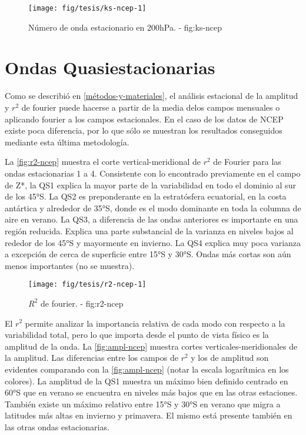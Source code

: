 \documentclass[spanish,a4paper]{book}
\begin{document}
\begin{figure*}
\texttt{[image: fig/tesis/ks-ncep-1]} \caption{Número de onda estacionario en 200hPa. - fig:ks-ncep}\label{fig:ks-ncep}
\end{figure*}

\section{Ondas Quasiestacionarias}\label{ondas-quasiestacionarias}

Como se describió en \autoref{métodos-y-materiales}, el análisis
estacional de la amplitud y \(r^2\) de fourier puede hacerse a partir de
la media delos campos mensuales o aplicando fourier a los campos
estacionales. En el caso de los datos de NCEP existe poca diferencia,
por lo que sólo se muestran los resultados conseguidos mediante esta
última metodología.

La \autoref{fig:r2-ncep} muestra el corte vertical-meridional de \(r^2\)
de Fourier para las ondas estacionarias 1 a 4. Consistente con lo
encontrado previamente en el campo de Z*, la QS1 explica la mayor parte
de la variabilidad en todo el dominio al sur de los 45°S. La QS2 es
preponderante en la estratósfera ecuatorial, en la costa antártica y
alrededor de 35°S, donde es el modo dominante en toda la columna de aire
en verano. La QS3, a diferencia de las ondas anteriores es importante en
una región reducida. Explica una parte substancial de la varianza en
niveles bajos al rededor de los 45°S y mayormente en invierno. La QS4
explica muy poca varianza a excepción de cerca de superficie entre 15°S
y 30°S. Ondas más cortas son aún menos importantes (no se muestra).

\begin{landscape}\begin{figure}

{\centering \texttt{[image: fig/tesis/r2-ncep-1]} 

}

\caption{$R^2$ de fourier. - fig:r2-ncep}\label{fig:r2-ncep}
\end{figure}
\end{landscape}

El \(r^2\) permite analizar la importancia relativa de cada modo con
respecto a la variabilidad total, pero lo que importa desde el punto de
vista físico es la amplitud de la onda. La \autoref{fig:ampl-ncep}
muestra cortes verticales-meridionales de la amplitud. Las diferencias
entre los campos de \(r^2\) y los de amplitud son evidentes comparando
con la \autoref{fig:ampl-ncep} (notar la escala logarítmica en los
colores). La amplitud de la QS1 muestra un máximo bien definido centrado
en 60°S que en verano se encuentra en niveles más bajos que en las otras
estaciones. También existe un máximo relativo entre 15°S y 30°S en
verano que migra a latitudes más altas en invierno y primavera. El mismo
está presente también en las otras ondas estacionarias.
\end{document}
